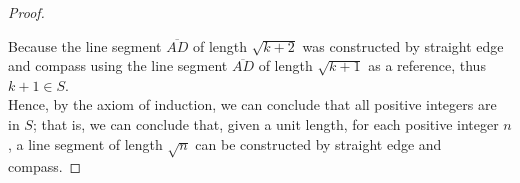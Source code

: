 \documentclass{article}
\begin{document}
\begin{proof}
        \begin{center}
        \end{center}

        \noindent Because the line segment $\overline{AD}$ of length $\sqrt{k+2}$ was constructed by straight edge and compass using the line segment $\overline{AD}$ of length $\sqrt{k+1}$ as a reference, thus
        $k+1\in S$. \\

        \noindent Hence, by the axiom of induction, we can conclude that all positive integers are in $S$; that is, we can conclude that, given a unit length, for each positive integer $n$, a line segment of length
        $\sqrt{n}$ can be constructed by straight edge and compass.


    \end{proof}
\end{document}
